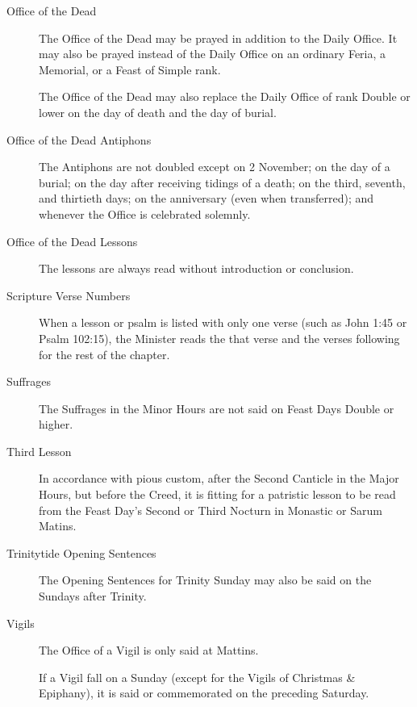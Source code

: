 \begin{description}
\item[Office of the Dead] The Office of the Dead may be prayed in addition to the Daily Office. It may also be prayed instead of the Daily Office on an ordinary Feria, a Memorial, or a Feast of Simple rank.\par
The Office of the Dead may also replace the Daily Office of rank Double or lower on the day of death and the day of burial.
\item[Office of the Dead Antiphons] The Antiphons are not doubled except on 2 November; %
on the day of a burial; on the day after receiving tidings of a death; on the third, seventh, and thirtieth days; on the anniversary (even when transferred); and whenever the Office is celebrated solemnly.
\item[Office of the Dead Lessons] The lessons are always read without introduction or conclusion.
\item[Scripture Verse Numbers] When a lesson or psalm is listed with only one verse (such as John 1:45 or Psalm 102:15), the Minister reads the that verse and the verses following for the rest of the chapter.
\item[Suffrages] The Suffrages in the Minor Hours are not said on Feast Days Double or higher.
\item[Third Lesson] In accordance with pious custom, after the Second Canticle in the Major Hours, but before the Creed, it is fitting for a patristic lesson to be read from the Feast Day's Second or Third Nocturn in Monastic or Sarum Matins.
\item[Trinitytide Opening Sentences] The Opening Sentences for Trinity Sunday may also be said on the Sundays after Trinity.
\item[Vigils] %
The Office of a Vigil is only said at Mattins.\par
If a Vigil fall on a Sunday (except for the Vigils of Christmas \& Epiphany), it is said or commemorated on the preceding Saturday.
\end{description}

